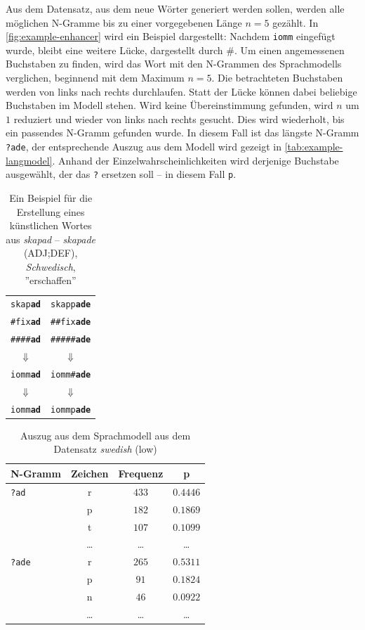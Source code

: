\documentclass[11pt,a4paper]{article}
\newcommand{\lang}[1]{\textit{#1}}
\begin{document}
Aus dem Datensatz, aus dem neue Wörter generiert werden sollen, werden alle möglichen N-Gramme bis zu einer vorgegebenen Länge $n=5$ gezählt. In \autoref{fig:example-enhancer} wird ein Beispiel dargestellt: Nachdem \texttt{iomm} eingefügt wurde, bleibt eine weitere Lücke, dargestellt durch \#. Um einen angemessenen Buchstaben zu finden, wird das Wort mit den N-Grammen des Sprachmodells verglichen, beginnend mit dem Maximum $n = 5$. Die betrachteten Buchstaben werden von links nach rechts durchlaufen. Statt der Lücke können dabei beliebige Buchstaben im Modell stehen. Wird keine Übereinstimmung gefunden, wird $n$ um $1$ reduziert und wieder von links nach rechts gesucht. Dies wird wiederholt, bis ein passendes N-Gramm gefunden wurde. In diesem Fall ist das längste N-Gramm \texttt{?ade}, der entsprechende Auszug aus dem Modell wird gezeigt in \autoref{tab:example-langmodel}. Anhand der Einzelwahrscheinlichkeiten wird derjenige Buchstabe ausgewählt, der das \texttt{?} ersetzen soll -- in diesem Fall \texttt{p}.

\begin{table}
\centering
\begin{tabular}{cc}
\toprule
\texttt{skap\textbf{ad}} & \texttt{skapp\textbf{ade}}\\  %
\texttt{\#fix\textbf{ad}} & \texttt{\#\#fix\textbf{ade}}\\ \midrule
\texttt{\#\#\#\#\textbf{ad}} & \texttt{\#\#\#\#\#\textbf{ade}} \\
$\Downarrow$ & $\Downarrow$\\
\texttt{iomm\textbf{ad}} & \texttt{iomm\#\textbf{ade}}\\
$\Downarrow$ & $\Downarrow$\\
\texttt{iomm\textbf{ad}} & \texttt{iommp\textbf{ade}}\\
\bottomrule
\end{tabular}
\caption{Ein Beispiel für die Erstellung eines künstlichen Wortes aus \textit{skapad} -- \textit{skapade} (ADJ;DEF), \lang{Schwedisch}, ''erschaffen''}
\label{fig:example-enhancer}
\end{table}

\begin{table}
\centering
\begin{tabular}{lccc}
\toprule
N-Gramm & Zeichen & Frequenz & p\\ \midrule
 \texttt{?ad} & r & $433$ & $0.4446$ \\
 & p & $182$ & $0.1869$\\
 & t & $107$ & $0.1099$\\ 
& \ldots & \ldots & \ldots \\ \midrule
\texttt{?ade} & r & $265$ & $0.5311$\\
 & p & $91$ & $0.1824$\\
 & n & $46$ & $0.0922$ \\
 & \ldots & \ldots & \ldots \\ 
 \bottomrule
\end{tabular}
\caption{Auszug aus dem Sprachmodell aus dem Datensatz \lang{swedish} (low)}
\label{tab:example-langmodel}
\end{table}
\end{document}
